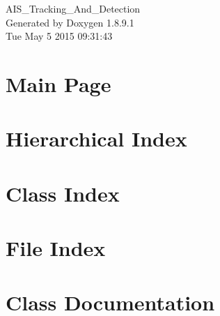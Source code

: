 \documentclass[twoside]{book}
\newcommand{\+}{\discretionary{\mbox{\scriptsize$\hookleftarrow$}}{}{}}
\newcommand{\clearemptydoublepage}{%
  \newpage{\pagestyle{empty}\cleardoublepage}%
}
\begin{document}
\hypersetup{pageanchor=false,
             bookmarks=true,
             bookmarksnumbered=true,
             pdfencoding=unicode
            }
\begin{titlepage}
\vspace*{7cm}
\begin{center}%
{\Large A\+I\+S\+\_\+\+Tracking\+\_\+\+And\+\_\+\+Detection }\\
\vspace*{1cm}
{\large Generated by Doxygen 1.8.9.1}\\
\vspace*{0.5cm}
{\small Tue May 5 2015 09:31:43}\\
\end{center}
\end{titlepage}
\clearemptydoublepage
\tableofcontents
\clearemptydoublepage
{}
\hypersetup{pageanchor=true}

\chapter{Main Page}
\label{index}\hypertarget{index}{}
\chapter{Hierarchical Index}

\chapter{Class Index}

\chapter{File Index}

\chapter{Class Documentation}
















\end{document}
